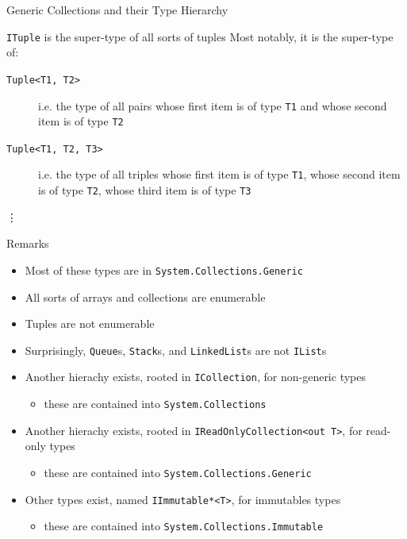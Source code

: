 \documentclass[presentation]{beamer}
\begin{document}
\begin{frame}[allowframebreaks]{Generic Collections and their Type Hierarchy}
  \begin{block}{\texttt{ITuple} is the super-type of all sorts of tuples}
    Most notably, it is the super-type of:
    \begin{description}
      \item[\texttt{Tuple<T1, T2>}] i.e. the type of all \alert{pairs} whose \alert{first} item is of type \alert{\texttt{T1}} and whose \alert{second} item is of type \alert{\texttt{T2}}
      \item[\texttt{Tuple<T1, T2, T3>}] i.e. the type of all \alert{triples} whose \alert{first} item is of type \alert{\texttt{T1}}, whose \alert{second} item is of type \alert{\texttt{T2}}, whose \alert{third} item is of type \alert{\texttt{T3}}
      \item[\vdots]
    \end{description}
  \end{block}

  \begin{exampleblock}{Remarks}
    \begin{itemize}
      \item Most of these types are in \texttt{System.Collections.Generic}
      \item All \alert{sorts} of \alert{arrays} and collections are \alert{enumerable}
      \item Tuples are \alert{not} enumerable
      \item Surprisingly, \texttt{Queue}s, \texttt{Stack}s, and \texttt{LinkedList}s are \alert{not} \texttt{IList}s
      \item Another hierachy exists, rooted in \texttt{ICollection}, for \alert{non-generic} types
      \begin{itemize}
        \item these are contained into \texttt{System.Collections}
      \end{itemize}

      \item Another hierachy exists, rooted in \texttt{IReadOnlyCollection<out T>}, for \alert{read-only} types
      \begin{itemize}
        \item these are contained into \texttt{System.Collections.Generic}
      \end{itemize}

      \item Other types exist, named \texttt{IImmutable*<T>}, for \alert{immutables} types
      \begin{itemize}
        \item these are contained into \texttt{System.Collections.Immutable}
      \end{itemize}
    \end{itemize}
  \end{exampleblock}
\end{frame}
\end{document}
